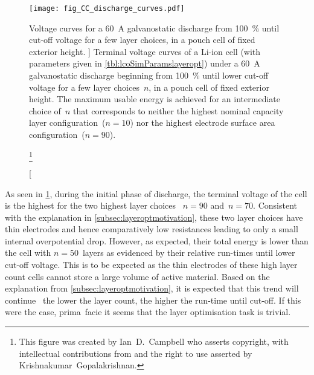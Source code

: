 

\begin{figure}[!bp]
    \begin{minipage}[t]{\textwidth}
        \centering
        \texttt{[image: fig\_CC\_discharge\_curves.pdf]}
        \captionsetup{labelsep=note}
        \caption
        [%
        Voltage curves for a \SI{60}{\ampere} galvanostatic discharge from
        \SI{100}{\percent}  until cut-off voltage for a few layer
        choices, in a pouch cell of fixed exterior height.
        ]%
        {%
            Terminal voltage curves of a Li-ion cell (with parameters
            given in \cref{tbl:lcoSimParamslayeropt}) under a \SI{60}{\ampere}
            galvanostatic discharge beginning from \SI{100}{\percent}
             until lower cut-off voltage for a few layer
            choices~$n$, in a pouch cell of fixed exterior height. The maximum
            usable energy is achieved for an intermediate choice of~$n$
            that corresponds to neither the highest nominal capacity layer
            configuration~(${n= 10}$) nor the highest electrode surface area
            configuration~(${n = 90}$).
        }%
        \label{fig:fig_CC_discharge_curves}
        \mpfootnotes[1]

        \footnote{This figure was created by \mbox{Ian D.\ Campbell} who asserts copyright,
            with intellectual contributions from and the right to use asserted by
        \mbox{Krishnakumar Gopalakrishnan}.}
    \end{minipage}
\end{figure}

As  seen  in \cref{fig:fig_CC_discharge_curves},  during  the  initial phase  of
discharge, the terminal voltage  of the cell is the highest  for the two highest
layer  choices \ie~${n  =  90}$ and~${n=70}$. Consistent  with  the explanation  in
\cref{subsec:layeroptmotivation}, these  two layer choices have  thin electrodes
and  hence  comparatively low  resistances  leading  to  only a  small  internal
overpotential drop. However,  as expected, their total energy is  lower than the
cell with  ${n=50}$~layers as  evidenced by  their relative run-times  until lower
cut-off voltage.  This is to  be expected as the  thin electrodes of  these high
layer count cells cannot  store a large volume of active  material. Based on the
explanation  from \cref{subsec:layeroptmotivation},  it  is  expected that  this
trend will continue \ie~the lower the layer count, the higher the run-time until
cut-off. If this were the case, prima~facie it seems that the layer optimisation
task is trivial.

